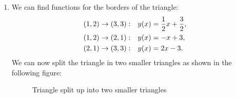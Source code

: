 \documentclass{exercise}
\begin{document}
	\begin{enumerate}
		\item We can find functions for the borders of the triangle:
		\begin{align*}
			\parentheses*{1, 2} \to \parentheses*{3, 3}:& \quad y\parentheses*{x} = \frac{1}{2}x + \frac{3}{2},\\
			\parentheses*{1, 2} \to \parentheses*{2, 1}:& \quad y\parentheses*{x} = -x + 3,\\
			\parentheses*{2, 1} \to \parentheses*{3, 3}:& \quad y\parentheses*{x} = 2x - 3.
		\end{align*}
		We can now split the triangle in two smaller triangles as shown in the following figure:
		\begin{figure}[h]
			\centering
			\caption{Triangle split up into two smaller triangles}
			\label{fig:1-1}
		\end{figure}


\end{enumerate}
\end{document}

